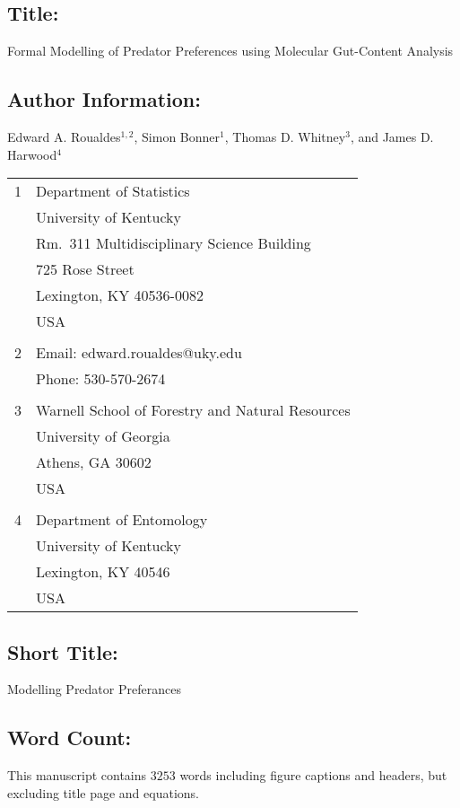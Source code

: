 \documentclass[12pt]{article}
\begin{document}
\subsection*{Title:}  Formal Modelling of Predator Preferences using Molecular Gut-Content Analysis

\subsection*{Author Information:}
Edward A. Roualdes$^{1,2}$, Simon Bonner$^1$, Thomas D. Whitney$^3$, and James D. Harwood$^4$
 
\begin{tabular}{ll}
  1 & Department of Statistics\\
  & University of Kentucky\\
  & Rm.~311 Multidisciplinary Science Building\\
  & 725 Rose Street\\
  & Lexington, KY 40536-0082\\
  & USA\\
  \\
  2 & Email: edward.roualdes@uky.edu\\
  & Phone: 530-570-2674\\
  \\
  3 & Warnell School of Forestry and Natural Resources \\
  & University of Georgia \\
  & Athens, GA 30602\\
  & USA \\
  \\
  4 & Department of Entomology\\
  & University of Kentucky \\
  & Lexington, KY 40546\\
  & USA \\
\end{tabular}

\subsection*{Short Title:}
Modelling Predator Preferances

\subsection*{Word Count:}
This manuscript contains $3253$ words including figure captions and headers, but excluding title page and equations. 
\end{document}
